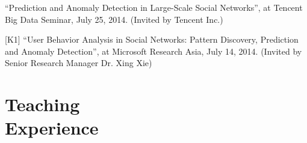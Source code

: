 \documentclass[margin, 9pt]{res}
\begin{document}
\begin{resume}
[K2] ``Prediction and Anomaly Detection in Large-Scale Social Networks'', at Tencent Big Data Seminar, July 25, 2014. (Invited by Tencent Inc.)

[K1] ``User Behavior Analysis in Social Networks: Pattern Discovery, Prediction and Anomaly Detection'', at Microsoft Research Asia, July 14, 2014. (Invited by Senior Research Manager Dr. Xing Xie)


\section{Teaching \\ Experience}


\end{resume}
\end{document}
